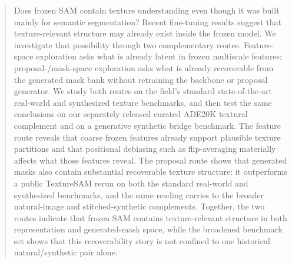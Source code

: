 \begin{abstract}
Does frozen SAM contain texture understanding even though it was built mainly for semantic segmentation? Recent fine-tuning results suggest that texture-relevant structure may already exist inside the frozen model. We investigate that possibility through two complementary routes. Feature-space exploration asks what is already latent in frozen multiscale features; proposal-/mask-space exploration asks what is already recoverable from the generated mask bank without retraining the backbone or proposal generator. We study both routes on the field's standard state-of-the-art real-world and synthesized texture benchmarks, and then test the same conclusions on our separately released curated ADE20K textural complement and on a generative synthetic bridge benchmark. The feature route reveals that coarse frozen features already support plausible texture partitions and that positional debiasing such as flip-averaging materially affects what those features reveal. The proposal route shows that generated masks also contain substantial recoverable texture structure: it outperforms a public TextureSAM rerun on both the standard real-world and synthesized benchmarks, and the same reading carries to the broader natural-image and stitched-synthetic complements. Together, the two routes indicate that frozen SAM contains texture-relevant structure in both representation and generated-mask space, while the broadened benchmark set shows that this recoverability story is not confined to one historical natural/synthetic pair alone. \codelinksentence
\end{abstract}
